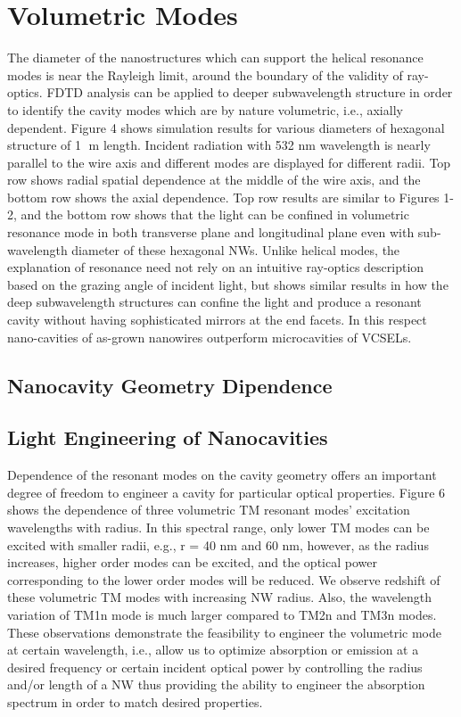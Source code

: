 \section{Volumetric Modes} \label{sed} The diameter of the nanostructures which
can support the helical resonance modes is near the Rayleigh limit, around the
boundary of the validity of ray-optics. FDTD analysis can be applied to deeper
subwavelength structure in order to identify the cavity modes which are by
nature volumetric, i.e., axially dependent.  Figure 4 shows simulation results
for various diameters of hexagonal structure of 1 m length.  Incident
radiation with 532 nm wavelength is nearly parallel to the wire axis and
different modes are displayed for different radii. Top row shows radial spatial
dependence at the middle of the wire axis, and the bottom row shows the axial
dependence. Top row results are similar to Figures 1-2, and the bottom row
shows that the light can be confined in volumetric resonance mode in both
transverse plane and longitudinal plane even with sub-wavelength diameter of
these hexagonal NWs. Unlike helical modes, the explanation of resonance  need
not rely on an intuitive ray-optics description based on the grazing angle of
incident light, but shows similar results in how the deep subwavelength
structures can confine the light and produce a resonant cavity without having
sophisticated mirrors at the end facets. In this respect nano-cavities of
as-grown nanowires outperform microcavities of VCSELs.  \subsection{Nanocavity
Geometry Dipendence}

\subsection{Light Engineering of Nanocavities}

Dependence of the resonant modes on the cavity geometry offers an important
degree of freedom to engineer a cavity for particular optical properties.
Figure 6 shows the dependence of three volumetric TM resonant modes’ excitation
wavelengths with radius. In this spectral range, only lower TM modes can be
excited with smaller radii, e.g., r = 40 nm and 60 nm, however, as the radius
increases, higher order modes can be excited, and the optical power
corresponding to the lower order modes will be reduced. We observe redshift of
these volumetric TM modes with increasing NW radius. Also, the wavelength
variation of TM1n mode is much larger compared to TM2n and TM3n modes. These
observations demonstrate the feasibility to engineer the volumetric mode at
certain wavelength, i.e., allow us to optimize absorption or emission at a
desired frequency or certain incident optical power  by controlling the radius
and/or length of a NW thus providing the ability to engineer the absorption
spectrum in order to match desired properties.

